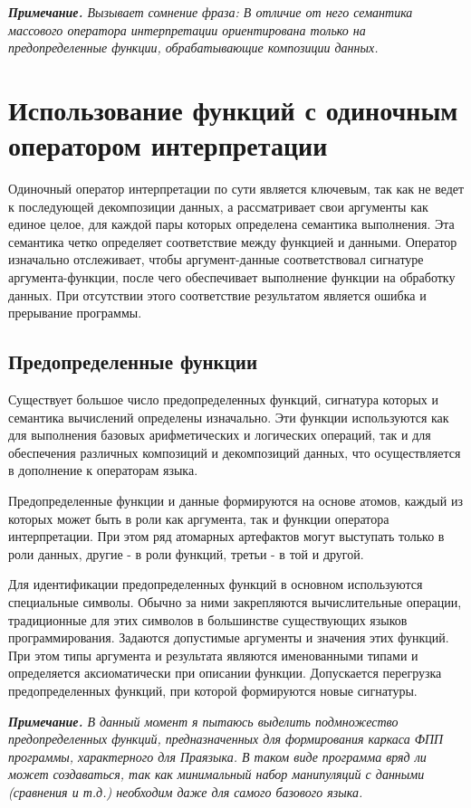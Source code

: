 \textit{\textbf{Примечание.} Вызывает сомнение фраза:
В отличие от него семантика массового оператора интерпретации ориентирована только на предопределенные функции, обрабатывающие композиции данных.}

\section{Использование функций с одиночным оператором интерпретации}

Одиночный оператор интерпретации по сути является ключевым, так как не ведет к последующей декомпозиции данных, а рассматривает свои аргументы как единое целое, для каждой пары которых определена семантика выполнения. Эта семантика четко определяет соответствие между функцией и данными. Оператор изначально отслеживает, чтобы аргумент-данные соответствовал сигнатуре аргумента-функции, после чего обеспечивает выполнение функции на обработку данных. При отсутствии этого соответствие результатом является ошибка и прерывание программы.

\subsection{Предопределенные функции}

Существует большое число предопределенных функций, сигнатура которых и семантика вычислений определены изначально. Эти функции используются как для выполнения базовых арифметических и логических операций, так и для обеспечения различных композиций и декомпозиций данных, что осуществляется в дополнение к операторам языка.

Предопределенные функции и данные формируются на основе атомов, каждый из которых может быть в роли как аргумента, так и функции оператора интерпретации. При этом ряд атомарных артефактов могут выступать только в роли данных, другие - в роли функций, третьи - в той и другой.

Для идентификации предопределенных функций в основном используются специальные символы. Обычно за ними закрепляются вычислительные операции, традиционные для этих символов в большинстве существующих языков программирования. Задаются допустимые аргументы и значения этих функций. При этом типы аргумента и результата являются именованными типами и определяется аксиоматически при описании функции. Допускается перегрузка предопределенных функций, при которой формируются новые сигнатуры.

\textit{\textbf{Примечание.}
В данный момент я пытаюсь выделить подмножество предопределенных функций, предназначенных для формирования каркаса ФПП программы, характерного для Праязыка. В таком виде программа вряд ли может создаваться, так как минимальный набор манипуляций с данными (сравнения и т.д.) необходим даже для самого базового языка.}

